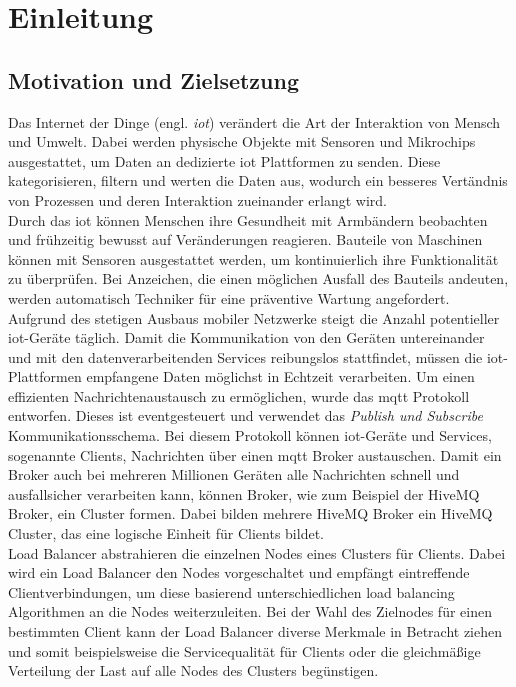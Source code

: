 \section{Einleitung}
\subsection{Motivation und Zielsetzung}
Das Internet der Dinge (engl. \textit{\ac{iot}}) verändert die Art der Interaktion von Mensch und Umwelt. Dabei werden physische Objekte mit Sensoren und Mikrochips ausgestattet, um Daten an dedizierte \ac{iot} Plattformen zu senden. Diese kategorisieren, filtern und werten die Daten aus, wodurch ein besseres Vertändnis von Prozessen und deren Interaktion zueinander erlangt wird.
\\
Durch das \acl{iot} können Menschen ihre Gesundheit mit Armbändern beobachten und frühzeitig bewusst auf Veränderungen reagieren. Bauteile von Maschinen können mit Sensoren ausgestattet werden, um kontinuierlich ihre Funktionalität zu überprüfen. Bei Anzeichen, die einen möglichen Ausfall des Bauteils andeuten, werden automatisch Techniker für eine präventive Wartung angefordert.
\\
Aufgrund des stetigen Ausbaus mobiler Netzwerke steigt die Anzahl potentieller \ac{iot}-Geräte täglich. Damit die Kommunikation von den Geräten untereinander und mit den datenverarbeitenden Services reibungslos stattfindet, müssen die \ac{iot}-Plattformen empfangene Daten möglichst in Echtzeit verarbeiten.
Um einen effizienten Nachrichtenaustausch zu ermöglichen, wurde das \ac{mqtt} Protokoll entworfen.
Dieses ist eventgesteuert und verwendet das \textit{Publish und Subscribe} Kommunikationsschema.
Bei diesem Protokoll können \ac{iot}-Geräte und Services, sogenannte Clients, Nachrichten über einen \ac{mqtt} Broker austauschen.
Damit ein Broker auch bei mehreren Millionen Geräten alle Nachrichten schnell und ausfallsicher verarbeiten kann, können Broker, wie zum Beispiel der HiveMQ Broker, ein Cluster formen. Dabei bilden mehrere HiveMQ Broker ein HiveMQ Cluster, das eine logische Einheit für Clients bildet.
\\
Load Balancer abstrahieren die einzelnen Nodes eines Clusters für Clients.
Dabei wird ein Load Balancer den Nodes vorgeschaltet und empfängt eintreffende Clientverbindungen, um diese basierend unterschiedlichen load balancing Algorithmen an die Nodes weiterzuleiten.
Bei der Wahl des Zielnodes für einen bestimmten Client kann der Load Balancer diverse Merkmale in Betracht ziehen und somit beispielsweise die Servicequalität für Clients oder die gleichmä{\ss}ige Verteilung der Last auf alle Nodes des Clusters begünstigen.
